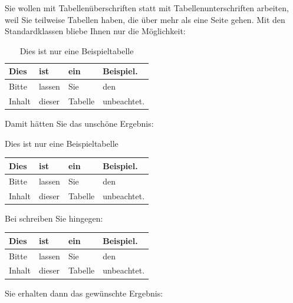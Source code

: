 \begin{Example}
  Sie wollen mit
  Tabellenüberschriften statt mit
  Tabellenunterschriften arbeiten, weil Sie teilweise Tabellen haben, die über
  mehr als eine Seite gehen. Mit den Standardklassen bliebe Ihnen nur die
  Möglichkeit:
\begin{lstcode}
  \begin{table}
    \caption{Dies ist nur eine Beispieltabelle}
    \begin{tabular}{llll}
      Dies & ist & ein & Beispiel.\\\hline
      Bitte & lassen & Sie & den \\
      Inhalt & dieser & Tabelle & unbeachtet.
    \end{tabular}
  \end{table}
\end{lstcode}
  Damit hätten Sie das unschöne Ergebnis:
  \begin{ShowOutput}\centering
    {
      Dies ist nur eine
      Beispieltabelle}\\
    \begin{tabular}{llll}
      Dies & ist & ein & Beispiel.\\\hline
      Bitte & lassen & Sie & den \\
      Inhalt & dieser & Tabelle & unbeachtet.
    \end{tabular}
  \end{ShowOutput}
  Bei \KOMAScript{} schreiben Sie hingegen:
\begin{lstcode}
  \begin{table}
    \begin{tabular}{llll}
      Dies & ist & ein & Beispiel.\\\hline
      Bitte & lassen & Sie & den \\
      Inhalt & dieser & Tabelle & unbeachtet.
    \end{tabular}
  \end{table}
\end{lstcode}
  Sie erhalten dann das gewünschte Ergebnis:
\end{Example}
